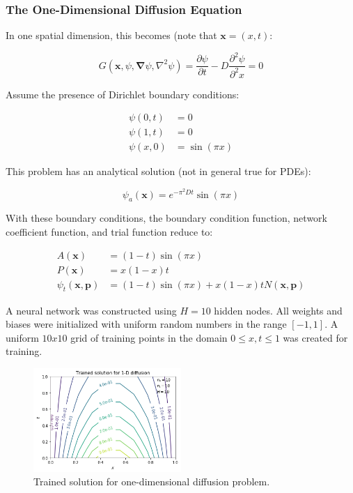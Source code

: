 \documentclass{article}
\begin{document}
\subsubsection{The One-Dimensional Diffusion Equation}

In one spatial dimension, this becomes (note that $\mathbf x = (x,t)$:

\begin{equation}
  G \left( \mathbf x, \psi, \mathbf \nabla \psi, \nabla^2 \psi \right) = \frac {\partial \psi} {\partial t} - D \frac {\partial^2 \psi} {\partial^2 x} = 0
\end{equation}

Assume the presence of Dirichlet boundary conditions:

\begin{equation}
\begin{split}
  \psi(0,t) &= 0 \\
  \psi(1,t) &= 0 \\
  \psi(x,0) &= \sin(\pi x)
\end{split}
\end{equation}

This problem has an analytical solution (not in general true for PDEs):

\begin{equation}
  \psi_a(\mathbf x) = e^{-\pi^2 D t} \sin(\pi x)
\end{equation}

With these boundary conditions, the boundary condition function, network coefficient function, and trial function reduce to:

\begin{equation}
\begin{split}
  A(\mathbf x) &= (1 - t)\sin(\pi x) \\
  P(\mathbf x) &= x(1 - x)t \\
  \psi_t(\mathbf x,\mathbf p) &= (1 - t)\sin(\pi x) + x(1 - x)t N(\mathbf x,\mathbf p)
\end{split}
\end{equation}

A neural network was constructed using $H=10$ hidden nodes. All weights and biases were initialized with uniform random numbers in the range $[-1,1]$. A uniform $10x10$ grid of training points in the domain $0 \leq x,t \leq 1$ was created for training.

\begin{figure}
    \centering
    \includegraphics[width=0.5\textwidth]{figures/diff1d_trained.png}
    \caption{Trained solution for one-dimensional diffusion problem.}
    \label{fig:diff1d_trained}
\end{figure}
\end{document}
